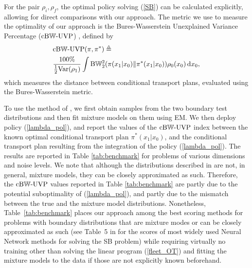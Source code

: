 \documentclass[twoside]{article}
\renewcommand{\eqref}[1]{(\ref{#1})}
\renewcommand{\d}{\mathrm{d}}
\newcommand{\panos}[1]{{\color{red}[Panos: #1]}}
\begin{document}
For the pair $\rho_i, \rho_f$, the optimal policy solving \eqref{SB} can be calculated explicitly, allowing for direct comparisons with our approach.
%
The metric we use to measure the optimality of our approach is the 
Bures-Wasserstein Unexplained Variance Percentage ($\mathrm{cB}{\mathbb{W}}\mbox{-}\mathrm{UVP}$) \citep{gushchin2023building}, defined by
\begin{subequations}
\begin{align*}
& \mathrm{cB}\sW\mbox{-}\mathrm{UVP}(\pi, \pi^*) \triangleq  \nonumber \\
& \frac{100\%}{\frac{1}{2} \mathrm{Var}(\rho_1) } \int \mathrm{B}\sW_2^2(\pi(x_1|x_0) \| \pi^*(x_1|x_0)) \rho_0(x_0) \, \d x_0,
\end{align*}
\end{subequations}
which measures the distance between conditional transport plans, evaluated using the Bures-Wasserstein metric. 

To use the method of \cite{gushchin2023building}, we first obtain samples from the two boundary test distributions and then fit mixture models on them using EM.
We then deploy policy \eqref{lambda_pol}, and report the values of the $\mathrm{cB}{\mathbb{W}}\mbox{-}\mathrm{UVP}$ index between the known optimal conditional transport plan $\pi^*(x_1\vert x_0)$, and the conditional transport plan resulting from the integration of the policy \eqref{lambda_pol}.
The results are reported in Table \ref{tab:benchmark} for problems of various dimensions and noise levels.
We note that although the distributions described in \cite{gushchin2023building} are not, in general, mixture models, they can be closely approximated as such.
Therefore, the $\mathrm{cB}{\mathbb{W}}\mbox{-}\mathrm{UVP}$  values reported in Table \ref{tab:benchmark} are partly due to the potential suboptimality of \eqref{lambda_pol}, and partly due to the mismatch between the true and the mixture model distributions.
%
Nonetheless, Table~\ref{tab:benchmark} places our approach among the best scoring methods for problems with boundary distributions that are mixture modes or can be closely approximated as such (see Table~5 in \citep{gushchin2023building}  for the scores of most widely used Neural Network methods for solving the SB problem)
%
%
while requiring virtually no training other than solving the linear program \eqref{fleet_OT} and fitting the mixture models to the data if those are not explicitly known beforehand. 
\end{document}
